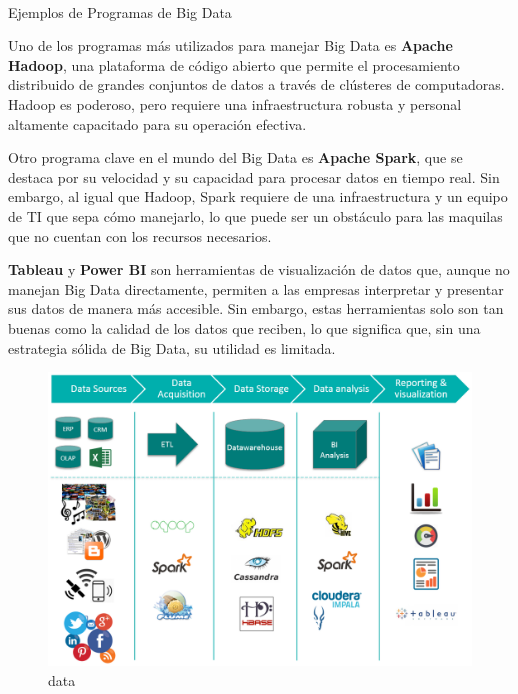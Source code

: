 \documentclass[
  letterpaper,
]{book}
\makeatletter
\let\oldparagraph\paragraph
\renewcommand{\paragraph}{
    \@ifstar
      \xxxParagraphStar
      \xxxParagraphNoStar
  }
\newcommand{\xxxParagraphStar}[1]{\oldparagraph*{#1}\mbox{}}
\newcommand{\xxxParagraphNoStar}[1]{\oldparagraph{#1}\mbox{}}
\makeatother
\begin{document}
\paragraph{Ejemplos de Programas de Big
Data}\label{ejemplos-de-programas-de-big-data}

Uno de los programas más utilizados para manejar Big Data es
\textbf{Apache Hadoop}, una plataforma de código abierto que permite el
procesamiento distribuido de grandes conjuntos de datos a través de
clústeres de computadoras. Hadoop es poderoso, pero requiere una
infraestructura robusta y personal altamente capacitado para su
operación efectiva.

Otro programa clave en el mundo del Big Data es \textbf{Apache Spark},
que se destaca por su velocidad y su capacidad para procesar datos en
tiempo real. Sin embargo, al igual que Hadoop, Spark requiere de una
infraestructura y un equipo de TI que sepa cómo manejarlo, lo que puede
ser un obstáculo para las maquilas que no cuentan con los recursos
necesarios.

\textbf{Tableau} y \textbf{Power BI} son herramientas de visualización
de datos que, aunque no manejan Big Data directamente, permiten a las
empresas interpretar y presentar sus datos de manera más accesible. Sin
embargo, estas herramientas solo son tan buenas como la calidad de los
datos que reciben, lo que significa que, sin una estrategia sólida de
Big Data, su utilidad es limitada.

\begin{figure}[H]

{\centering \includegraphics{Img/data.png}

}

\caption{data}

\end{figure}%
\end{document}
